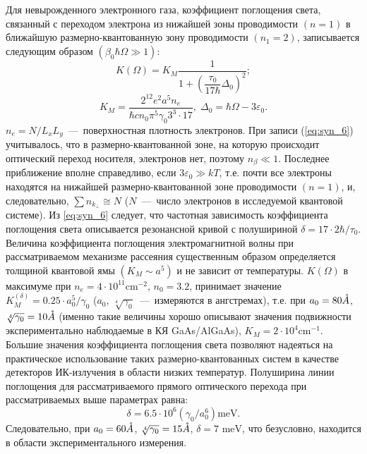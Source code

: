Для невырожденного электронного газа, коэффициент поглощения света, связанный с переходом электрона из нижайшей зоны проводимости $(n=1)$ в ближайшую размерно-квантованную зону проводимости $(n_1=2)$, записывается следующим образом $(\beta _0\hbar \Omega \gg 1)$:
\begin{equation} \label{eq:syn_6}
K(\Omega) = K_M \frac{1}{1+\left(\dfrac{\tau_0 }{17 \hbar} \Delta_0 \right)^2 } ;
\end{equation} 
\[
K_M =\frac{2^{12} e^2 a^5 n_e }{\hbar cn_0 \pi^5 \gamma_0 3^3 \cdot 17}, \;
\Delta_0 =\hbar \Omega -3\varepsilon_0.
\]
$n_e =N/L_x L_y $~---~поверхностная плотность электронов. При записи (\ref{eq:syn_6}) учитывалось, что в размерно-квантованной зоне, на которую происходит оптический переход носителя, электронов нет, поэтому $n_{\beta } \ll 1$. Последнее приближение вполне справедливо, если  $3\varepsilon_0 \gg kT$, т.е. почти все электроны находятся на нижайшей размерно-квантованной зоне проводимости $(n=1)$, и, следовательно, $\sum n_{k_{\bot } } \cong N$ ($N$~---~число электронов в исследуемой квантовой системе). Из \eqref{eq:syn_6} следует, что частотная зависимость коэффициента поглощения света описывается резонансной кривой с полушириной  $\delta =17\cdot 2\hbar /\tau_0 $. Величина коэффициента поглощения электромагнитной волны при рассматриваемом механизме рассеяния существенным образом определяется толщиной квантовой ямы $\left(K_M \sim a^5 \right)$ и не зависит от температуры. $K\left(\Omega \right)$  в максимуме при $n_e =4\cdot 10^{11} \text{cm}^{-2} $, $n_0 = 3.2$,   принимает значение   $K_M^{\left(\delta \right)} =0.25\cdot a_0^5 /\gamma_0 $ ($a_0 $, $\sqrt[4]{\gamma_0}$~--–~измеряются в ангстремах), т.е. при  $a_0 = 80 \AA$,  $\sqrt[4]{\gamma_0} = 10 \AA$ (именно такие величины хорошо описывают значения подвижности   экспериментально наблюдаемые в КЯ GaAs/AlGaAs), $K_M =2\cdot 10^4 \text{cm}^{-1} $. Большие значения коэффициента поглощения света позволяют надеяться на практическое использование таких размерно-квантованных систем в качестве детекторов ИК-излучения в области низких температур. Полуширина линии поглощения для рассматриваемого прямого оптического перехода при рассматриваемых выше параметрах равна:
\[
\delta =6.5\cdot 10^6 \left(\gamma_0 /a_0^6 \right)\text{meV}.
\]
Следовательно, при  $a_0 = 60 \AA$,  $\sqrt[4]{\gamma_0} = 15 \AA$,  $\delta = 7 \text{ meV}$, что безусловно, находится в области экспериментального измерения.

